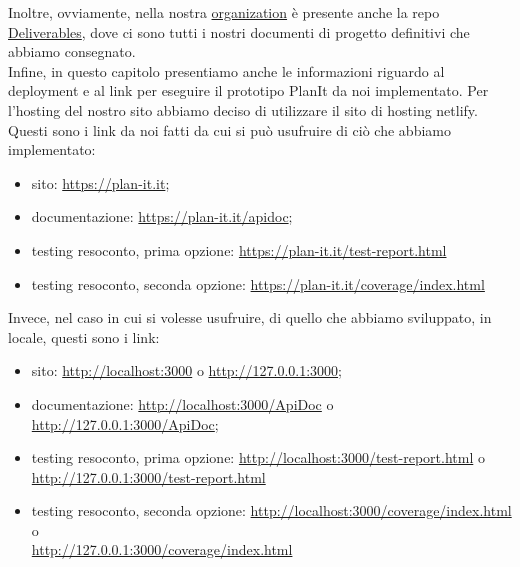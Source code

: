 Inoltre, ovviamente, nella nostra \href{https://github.com/orgs/Life-planner/repositories}{organization} è presente anche la repo \href{https://github.com/Life-planner/Deliverables}{Deliverables}, dove ci sono tutti i nostri documenti di progetto definitivi che abbiamo consegnato. \\
Infine, in questo capitolo presentiamo anche le informazioni riguardo al deployment e al link per eseguire il prototipo PlanIt da noi implementato. Per l'hosting del nostro sito abbiamo deciso di utilizzare il sito di hosting netlify. \\ Questi sono i link da noi fatti da cui si può usufruire di ciò che abbiamo implementato:
\begin{itemize}
    \item sito: \href{https://plan-it.it} {https://plan-it.it};
    \item documentazione: \href{https://plan-it.it/apidoc} {https://plan-it.it/apidoc};
    \item testing resoconto, prima opzione: \href{https://plan-it.it/test-report.html} {https://plan-it.it/test-report.html}
    \item testing resoconto, seconda opzione: \href{https://plan-it.it/coverage/index.html} {https://plan-it.it/coverage/index.html}

\end{itemize}

Invece, nel caso in cui si volesse usufruire, di quello che abbiamo sviluppato, in locale, questi sono i link:

\begin{itemize}
    \item sito: \href{http://localhost:3000} {http://localhost:3000} o \href{http://127.0.0.1:3000} {http://127.0.0.1:3000};
    \item documentazione: \href{http://localhost:3000/ApiDoc}{http://localhost:3000/ApiDoc} o \href{http://127.0.0.1:3000/ApiDoc}{http://127.0.0.1:3000/ApiDoc};
    \item testing resoconto, prima opzione: \href{http://localhost:3000/test-report.html}{http://localhost:3000/test-report.html} o \\
    \href{http://127.0.0.1:3000/test-report.html}{http://127.0.0.1:3000/test-report.html}
    \item testing resoconto, seconda opzione:
          \href{http://localhost:3000/coverage/index.html}{http://localhost:3000/coverage/index.html} o \\
          \href{http://127.0.0.1:3000/coverage/index.html}{http://127.0.0.1:3000/coverage/index.html}

\end{itemize}
